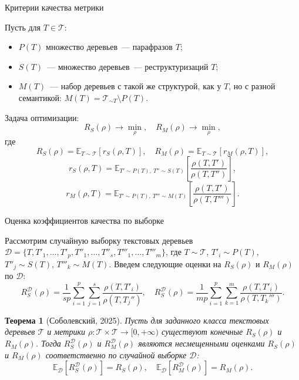 \documentclass{beamer}
\newcommand{\E}{\mathbb{E}}
\newtheorem{Th}{Теорема}
\begin{document}

\begin{frame}{Критерии качества метрики}

Пусть для $T\in\mathcal{T}$:
\begin{itemize}
    \item $P(T)$ множество деревьев~--- парафразов $T$;
    \item $S(T)$~--- множество деревьев~--- реструктуризаций $T$; 
    \item $M(T)$~--- набор деревьев с такой же структурой, как у $T$, но с разной семантикой: $M(T) = \mathcal{T}_{\sim T} \setminus P(T)$.
\end{itemize}
Задача оптимизации:
$$
R_S(\rho) \longrightarrow \min_\rho, \quad  R_M(\rho) \longrightarrow \min_\rho,
$$
где
$$
R_S(\rho) = \E_{T\sim \mathcal{T}}[r_S(\rho, T)], \quad R_M(\rho) = \E_{T\sim \mathcal{T}}[r_M(\rho, T)],
$$
$$
r_S(\rho, T) = \E_{T'\sim P(T), \ T''\sim S(T)} \left[\frac{\rho(T, T')}{\rho(T, T'')}\right],
$$
$$
r_M(\rho, T) = \E_{T'\sim P(T), \ T'''\sim M(T)} \left[\frac{\rho(T, T')}{\rho(T, T''')}\right].
$$

\end{frame}


\begin{frame}{Оценка коэффициентов качества по выборке}

Рассмотрим случайную выборку текстовых деревьев $\mathcal{D} = \{T, T'_1, \dots, T'_p, T''_1, \dots, T''_s, T'''_1, \dots, T'''_m\}$, где $T\sim \mathcal{T}$, $T'_i\sim P(T)$, $T''_j\sim S(T)$, $T'''_k\sim M(T)$. Введем следующие оценки на $R_S(\rho)$ и $R_M(\rho)$ по $\mathcal{D}$:
$$
R^\mathcal{D}_S(\rho) = \frac{1}{sp}\sum\limits_{i=1}^p\sum\limits_{j=1}^s\frac{\rho(T, T'_i)}{\rho(T, T_j'')},
\quad R^\mathcal{D}_S(\rho) = \frac{1}{mp}\sum\limits_{i=1}^p\sum\limits_{k=1}^m\frac{\rho(T, T'_i)}{\rho(T, T_k''')}.
$$
\begin{Th}[Соболевский, 2025]
    Пусть для заданного класса текстовых деревьев $\mathcal{T}$ и метрики $\rho: \mathcal{T}\times\mathcal{T}\longrightarrow [0, +\infty)$ существуют конечные $R_S(\rho)$ и $R_M(\rho)$. Тогда $R_S^\mathcal{D}(\rho)$ и $R_M^\mathcal{D}(\rho)$ являются несмещенными оценками $R_S(\rho)$ и $R_M(\rho)$ соответственно по случайной выборке $\mathcal{D}$:
    $$
    \E_\mathcal{D}[R_S^\mathcal{D}(\rho)] = R_S(\rho), \quad \E_\mathcal{D}[R_M^\mathcal{D}(\rho)] = R_M(\rho).
    $$
\end{Th}
    
\end{frame}
\end{document}

